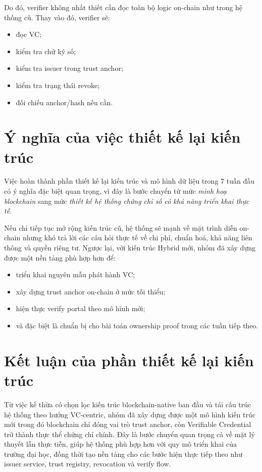 Do đó, verifier không nhất thiết cần đọc toàn bộ logic on-chain như trong hệ thống cũ. Thay vào đó, verifier sẽ:
\begin{itemize}
    \item đọc VC;
    \item kiểm tra chữ ký số;
    \item kiểm tra issuer trong trust anchor;
    \item kiểm tra trạng thái revoke;
    \item đối chiếu anchor/hash nếu cần.
\end{itemize}

\section{Ý nghĩa của việc thiết kế lại kiến trúc}

Việc hoàn thành phần thiết kế lại kiến trúc và mô hình dữ liệu trong 7 tuần đầu có ý nghĩa đặc biệt quan trọng, vì đây là bước chuyển từ mức \textit{minh hoạ blockchain} sang mức \textit{thiết kế hệ thống chứng chỉ số có khả năng triển khai thực tế}. 

Nếu chỉ tiếp tục mở rộng kiến trúc cũ, hệ thống sẽ mạnh về mặt trình diễn on-chain nhưng khó trả lời các câu hỏi thực tế về chi phí, chuẩn hoá, khả năng liên thông và quyền riêng tư. Ngược lại, với kiến trúc Hybrid mới, nhóm đã xây dựng được một nền tảng phù hợp hơn để:
\begin{itemize}
    \item triển khai nguyên mẫu phát hành VC;
    \item xây dựng trust anchor on-chain ở mức tối thiểu;
    \item hiện thực verify portal theo mô hình mới;
    \item và đặc biệt là chuẩn bị cho bài toán ownership proof trong các tuần tiếp theo.
\end{itemize}

\section{Kết luận của phần thiết kế lại kiến trúc}

Từ việc kế thừa có chọn lọc kiến trúc blockchain-native ban đầu và tái cấu trúc hệ thống theo hướng VC-centric, nhóm đã xây dựng được một mô hình kiến trúc mới trong đó blockchain chỉ đóng vai trò trust anchor, còn Verifiable Credential trở thành thực thể chứng chỉ chính. Đây là bước chuyển quan trọng cả về mặt lý thuyết lẫn thực tiễn, giúp hệ thống phù hợp hơn với quy mô triển khai của trường đại học, đồng thời tạo nền tảng cho các bước hiện thực tiếp theo như issuer service, trust registry, revocation và verify flow.